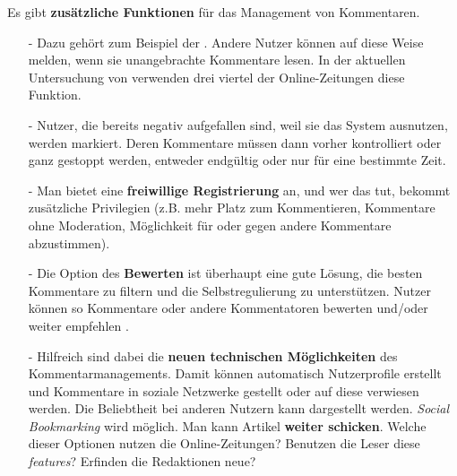 Es gibt {\bfseries zusätzliche  Funktionen} für das Management von Kommentaren.

\begin{itemize}

  \item[-] Dazu gehört zum Beispiel der  \grqq{} \autocite[S.~110f]{reich}. Andere Nutzer können auf
    diese Weise melden, wenn sie unangebrachte Kommentare lesen. In der
    aktuellen Untersuchung von \textcite[S.~63]{singer:2014} verwenden drei
    viertel der Online-Zeitungen diese Funktion.

  \item[-] Nutzer, die bereits negativ aufgefallen sind, weil sie das System
    ausnutzen, werden markiert. Deren Kommentare müssen dann vorher kontrolliert
    oder ganz gestoppt werden, entweder endgültig oder nur für eine bestimmte
    Zeit.

  \item[-] Man bietet eine  {\bfseries freiwillige Registrierung} an, und wer
    das tut, bekommt zusätzliche Privilegien (z.B. mehr Platz zum Kommentieren,
    Kommentare ohne Moderation, Möglichkeit für oder gegen andere Kommentare
    abzustimmen).

  \item[-] Die Option des {\bfseries \glqq Bewerten\grqq} ist überhaupt eine
    gute Lösung, die besten Kommentare zu filtern und die Selbstregulierung zu
    unterstützen. Nutzer können so Kommentare oder andere Kommentatoren bewerten
    und/oder weiter empfehlen \autocite[S.~63f]{singer:2014}.

  \item[-] Hilfreich sind dabei die {\bfseries neuen technischen Möglichkeiten}
    des Kommentarmanagements. Damit können automatisch Nutzerprofile erstellt
    und Kommentare in soziale Netzwerke gestellt oder auf diese verwiesen
    werden. Die Beliebtheit bei anderen Nutzern kann dargestellt werden.
    {\slshape Social Bookmarking} wird möglich. Man kann Artikel {\bfseries
    weiter schicken}. Welche dieser Optionen nutzen die Online-Zeitungen?
    Benutzen die Leser diese {\slshape features}? Erfinden die Redaktionen neue?


\end{itemize}


